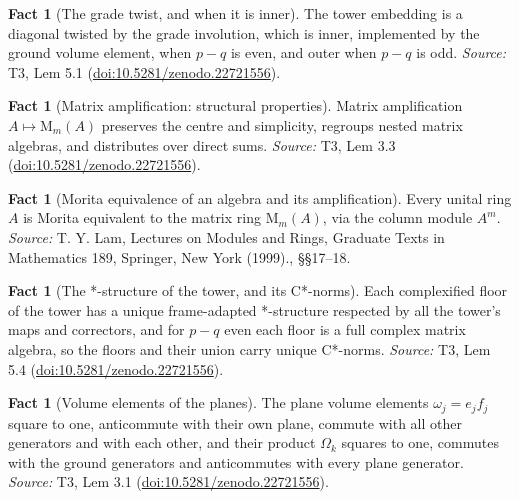 \documentclass[11pt]{article}
\theoremstyle{definition}
\newtheorem{fact}[theorem]{Fact}
\theoremstyle{plain}
\providecommand{\Mat}{}\renewcommand{\Mat}{\mathrm{M}}
\begin{document}
\begin{fact}[The grade twist, and when it is inner]\label{c:tower.grade-twist-when-it-inner}
The tower embedding is a diagonal twisted by the grade involution, which is inner, implemented by the ground volume element, when $p - q$ is even, and outer when $p - q$ is odd.
\emph{Source:} T3, Lem 5.1 (\href{https://doi.org/10.5281/zenodo.22721556}{doi:10.5281/zenodo.22721556}).
\end{fact}

\begin{fact}[Matrix amplification: structural properties]\label{c:tower.matrix-amplification-structural-properties}
Matrix amplification $A \mapsto \Mat_m(A)$ preserves the centre and simplicity, regroups nested matrix algebras, and distributes over direct sums.
\emph{Source:} T3, Lem 3.3 (\href{https://doi.org/10.5281/zenodo.22721556}{doi:10.5281/zenodo.22721556}).
\end{fact}

\begin{fact}[Morita equivalence of an algebra and its amplification]\label{c:tower.morita-equivalence-algebra-amplification}
Every unital ring $A$ is Morita equivalent to the matrix ring $\Mat_m(A)$, via the column module $A^m$.
\emph{Source:} T. Y. Lam, Lectures on Modules and Rings, Graduate Texts in Mathematics 189, Springer, New York (1999)., \S\S 17--18.
\end{fact}

\begin{fact}[The *-structure of the tower, and its C*-norms]\label{c:tower.structure-tower-c-norms}
Each complexified floor of the tower has a unique frame-adapted *-structure respected by all the tower's maps and correctors, and for $p - q$ even each floor is a full complex matrix algebra, so the floors and their union carry unique C*-norms.
\emph{Source:} T3, Lem 5.4 (\href{https://doi.org/10.5281/zenodo.22721556}{doi:10.5281/zenodo.22721556}).
\end{fact}

\begin{fact}[Volume elements of the planes]\label{c:tower.volume-elements-planes}
The plane volume elements $\omega_j = e_j f_j$ square to one, anticommute with their own plane, commute with all other generators and with each other, and their product $\Omega_k$ squares to one, commutes with the ground generators and anticommutes with every plane generator.
\emph{Source:} T3, Lem 3.1 (\href{https://doi.org/10.5281/zenodo.22721556}{doi:10.5281/zenodo.22721556}).
\end{fact}
\end{document}
